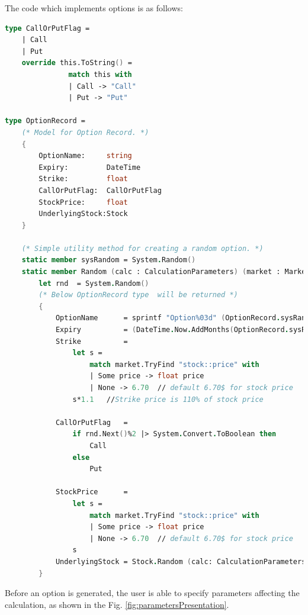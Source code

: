     The code which implements options is as follows:
    \begin{lstlisting}[language=FSharp, label={lst:option}, caption=F\# implementation of an option.]
type CallOrPutFlag =
    | Call
    | Put
    override this.ToString() =
               match this with
               | Call -> "Call"
               | Put -> "Put"
               
type OptionRecord =
    (* Model for Option Record. *)
    {
        OptionName:     string
        Expiry:         DateTime
        Strike:         float
        CallOrPutFlag:  CallOrPutFlag
        StockPrice:     float
        UnderlyingStock:Stock
    }

    (* Simple utility method for creating a random option. *)
    static member sysRandom = System.Random()
    static member Random (calc : CalculationParameters) (market : MarketData) =
        let rnd  = System.Random()
        (* Below OptionRecord type  will be returned *)
        {
            OptionName      = sprintf "Option%03d" (OptionRecord.sysRandom.Next(999))
            Expiry          = (DateTime.Now.AddMonths(OptionRecord.sysRandom.Next(2, 12))).Date
            Strike          =
                let s =
                    match market.TryFind "stock::price" with
                    | Some price -> float price
                    | None -> 6.70  // default 6.70$ for stock price
                s*1.1   //Strike price is 110% of stock price
            
            CallOrPutFlag   = 
                if rnd.Next()%2 |> System.Convert.ToBoolean then
                    Call
                else
                    Put
            
            StockPrice      =
                let s =
                    match market.TryFind "stock::price" with
                    | Some price -> float price
                    | None -> 6.70  // default 6.70$ for stock price
                s
            UnderlyingStock = Stock.Random (calc: CalculationParameters) (market : MarketData)
        }
    \end{lstlisting}
    Before an option is generated, the user is able to specify parameters affecting the calculation, as shown in the Fig. \ref{fig:parametersPresentation}.
